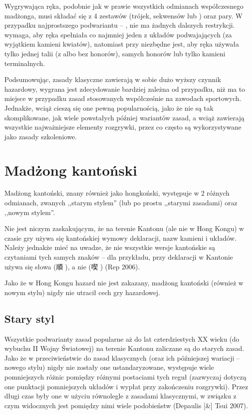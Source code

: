 Wygrywająca ręka, podobnie jak w prawie wszystkich odmianach współczesnego
madżonga, musi składać się z 4 zestawów (trójek, sekwensów lub )
oraz pary. W przypadku najprostszego podwariantu --  , nie
ma żadnych dalszych restrykcji.  wymaga, aby ręka spełniała co
najmniej jeden z układów podwajających (za wyjątkiem kamieni kwiatów), natomiast
przy  niezbędne jest, aby ręka używała tylko jednej talii
(z albo bez honorów), samych honorów lub tylko kamieni terminalnych.

Podsumowując, zasady klasyczne zawierają w sobie dużo wyższy czynnik hazardowy,
wygrana jest zdecydowanie bardziej zależna od przypadku, niż ma to miejsce w
przypadku zasad stosowanych współcześnie na zawodach sportowych. Jednakże, wciąż
cieszą się one pewną popularnością, jako że nie są tak skomplikowane, jak wiele
powstałych później wariantów zasad, a wciąż zawierają wszystkie najważniejsze
elementy rozgrywki, przez co często są wykorzystywane jako zasady szkoleniowe.

\section{Madżong kantoński}
\label{hkos}
Madżong kantoński, znany również jako hongkoński, występuje w 2 różnych
odmianach, zwanych ,,starym stylem'' (lub po prostu ,,starymi zasadami) oraz
,,nowym stylem''.

Nie jest niczym zaskakującym, że na terenie Kantonu (ale nie w Hong Kongu) w
czasie gry używa się kantońskiej wymowy deklaracji, nazw kamieni i układów.
Należy jednakże mieć na uwadze, że nie wszystkie wersje kantońskie są czytaniami
tych samych znaków -- dla przykładu, przy deklaracji  w Kantonie
używa się słowa  (順 ), a nie  (喫
) (Rep 2006).

Jako że w Hong Kongu hazard nie jest zakazany, madżong kantoński (również w
nowym stylu) nigdy nie utracił cech gry hazardowej. %

\subsection{Stary styl}
Wszystkie podwarianty zasad popularne aż do lat czterdziestych XX wieku (do
wybuchu II Wojny Światowej) na terenie Kantonu zaliczane są do starych zasad.
Jako że w przeciwieństwie do zasad klasycznych (oraz ich późniejszej wariacji --
nowego stylu) nigdy nie zostały one ustandaryzowane, występuje wiele
pomniejszych różnic pomiędzy różnymi postaciami tych reguł (zazwyczaj dotyczą
one punktacji pomniejszych układów i wypłat przy zakończeniu rozgrywki). Przez
długi czas były one w użyciu równolegle z zasadami klasycznymi, w związku z czym
widocznych jest pomiędzy nimi wiele podobieństw (Depaulis [\&] Tsui 2007).

